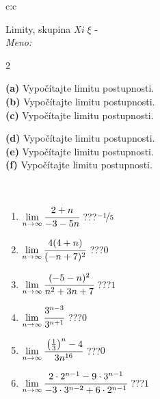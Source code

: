 \documentclass[10pt]{report}
\begin{document}
\newpage
\thispagestyle{empty}
\begin{tabular}{c:c}
\begin{minipage}[c][104.5mm][t]{0.5\linewidth}
\begin{center}
\vspace{5mm}
{\huge Limity, skupina \textit{Xi $\xi$} -}\\[5mm]
\textit{Meno:}\phantom{xxxxxxxxxxxxxxxxxxxxxxxxxxxxxxxxxxxxxxxxxxxxxxxxxxxxxxxxxxxxxxxxx}\\[5mm]
\begin{minipage}{0.95\linewidth}
\begin{center}
{\small \begin{multicols}{2} \raggedright
\textbf{(a)} Vypočítajte limitu postupnosti. \\[1mm]
\textbf{(b)} Vypočítajte limitu postupnosti. \\[1mm]
\textbf{(c)} Vypočítajte limitu postupnosti. \par \columnbreak
\textbf{(d)} Vypočítajte limitu postupnosti. \\[1mm]
\textbf{(e)} Vypočítajte limitu postupnosti. \\[1mm]
\textbf{(f)} Vypočítajte limitu postupnosti.
\end{multicols}
}
\end{center}
\end{minipage}
\\[1mm]
\begin{minipage}{0.79\linewidth}
\begin{center}
\begin{varwidth}{\linewidth}
\setlength{\itemsep}{0pt}
\begin{enumerate}
\footnotesizerr
\item $\lim\limits_{n\to\infty}\cfrac{2+n}{-3-5n}$\quad \dotfill\; ???\;\dotfill \quad $\nicefrac{-1}{5}$
\item $\lim\limits_{n\to\infty}\cfrac{4(4+n)}{(-n+7)^2}$\quad \dotfill\; ???\;\dotfill \quad $0$
\item $\lim\limits_{n\to\infty}\cfrac{(-5-n)^2}{n^2+3n+7}$\quad \dotfill\; ???\;\dotfill \quad $1$
\item $\lim\limits_{n\to\infty}\cfrac{3^{n-3}}{3^{n+1}}$\quad \dotfill\; ???\;\dotfill \quad $0$
\item $\lim\limits_{n\to\infty}\cfrac{\left(\frac{1}{3}\right)^n -4}{3n^{16}}$\quad \dotfill\; ???\;\dotfill \quad $0$
\item $\lim\limits_{n\to\infty}\cfrac{2\cdot 2^{n-1}-9\cdot 3^{n-1}}{-3\cdot 3^{n-2}+6\cdot 2^{n-1}}$\quad \dotfill\; ???\;\dotfill \quad $1$

\end{enumerate}
\end{varwidth}
\end{center}
\end{minipage}
\end{center}
\end{minipage}
\end{tabular}
\end{document}
